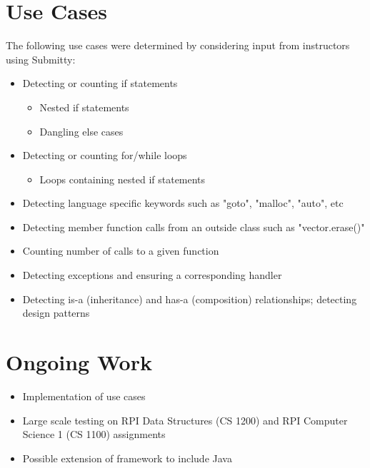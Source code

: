 \documentclass[thesis]{hmcposter}
\begin{document}
\begin{poster}
\section{Use Cases}
The following use cases were determined by considering input from instructors using Submitty:
\begin{itemize}
\item{Detecting or counting if statements}
	\begin{itemize}
		\item {Nested if statements}
		\item {Dangling else cases}
	\end{itemize}
\item{Detecting or counting for/while loops}
	\begin{itemize}
		\item {Loops containing nested if statements}
	\end{itemize}
\item{Detecting language specific keywords such as "goto", "malloc", "auto", etc}	
\item{Detecting member function calls from an outside class such as "vector.erase()"}
\item{Counting number of calls to a given function}
\item{Detecting exceptions and ensuring a corresponding handler}
\item{Detecting is-a (inheritance) and has-a (composition) relationships; detecting design patterns}
\end{itemize}

\section{Ongoing Work}
\begin{itemize}
\item{Implementation of use cases}
\item{Large scale testing on RPI Data Structures (CS 1200) and RPI Computer Science 1 (CS 1100) assignments}
\item{Possible extension of framework to include Java}
\end{itemize}



\end{poster}
\end{document}
